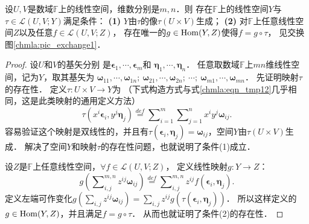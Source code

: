 \begin{theorem}\label{chmla:thm_jicunzai}
    设$U,V$是数域$\mathbb{F}$上的线性空间，维数分别是$m,n$．则
    存在$\mathbb{F}$上的线性空间$Y$与$\tau \in \mathscr{L}(U,V;Y)$满足条件：
    {\bfseries (1)} $Y$由$\tau$的像$\tau(U\times V)$生成；
    {\bfseries (2)} 对$\mathbb{F}$上任意线性空间$Z$以及任意$f \in \mathscr{L}(U,V;Z)$，
    存在唯一的$g\in {\rm Hom}(Y,Z)$使得$f=g \circ \tau$，
    见交换图\ref{chmla:pic_exchange1}．
\end{theorem}
\begin{proof}
    设$U$和$V$的基矢分别
    是$\boldsymbol{\epsilon}_1, \cdots, \boldsymbol{\epsilon}_m$和
    $\boldsymbol{\eta}_1, \cdots, \boldsymbol{\eta}_n$．
    任意取数域$\mathbb{F}$上$mn$维线性空间，记为$Y$，取其基矢为
    $\boldsymbol{\omega}_{11},  \cdots ,\boldsymbol{\omega}_{1n}; \
     \boldsymbol{\omega}_{21},  \cdots ,\boldsymbol{\omega}_{2n}; \  \cdots ;\ 
     \boldsymbol{\omega}_{m1}, \cdots ,\boldsymbol{\omega}_{mn}$．
    先证明映射$\tau$的存在性．    定义$\tau: U\times V \to Y$为
    （下式构造方式与式\eqref{chmla:eqn_tmp12}几乎相同，这是此类映射的通用定义方法）
    \begin{equation}\label{chmla:eqn_tensorpruduct}
            \tau \left(x^i\boldsymbol{\epsilon}_i, y^j\boldsymbol{\eta}_j\right)
            \overset{def}{=} \sum\nolimits_{i=1}^{m} \sum\nolimits_{j=1}^{n} x^i y^j \boldsymbol{\omega}_{ij} .
        \end{equation}
    容易验证这个映射是双线性的，并且有$\tau (\boldsymbol{\epsilon}_i, \boldsymbol{\eta}_j)
     = \boldsymbol{\omega}_{ij}$，空间$Y$由$\tau(U\times V)$生成．
    解决了空间$Y$和映射$\tau$的存在性问题，也就说明了条件(1)成立．



    设$Z$是$\mathbb{F}$上任意线性空间，$\forall f \in \mathscr{L}(U,V;Z)$，
    定义线性映射$g:Y \to Z$：
    \begin{equation}\label{chmla:eqn_fgtau}
            g \left(\sum\nolimits_{i,j}^{m,n} z^{ij}\boldsymbol{\omega}_{ij}\right)
            \overset{def}{=} \sum\nolimits_{i,j}^{m,n} z^{ij} f(\boldsymbol{\epsilon}_i, \boldsymbol{\eta}_j) .
    \end{equation}
    定义左端可作变化$g(\sum_{i,j} z^{ij}\boldsymbol{\omega}_{ij})
    = \sum_{i,j} z^{ij} g(\tau (\boldsymbol{\epsilon}_i, \boldsymbol{\eta}_j)  ) $．
    所以这样定义的$g\in {\rm Hom}(Y,Z)$，并且满足$f=g\circ \tau$．
    从而也就证明了条件(2)的存在性．


\end{proof}
